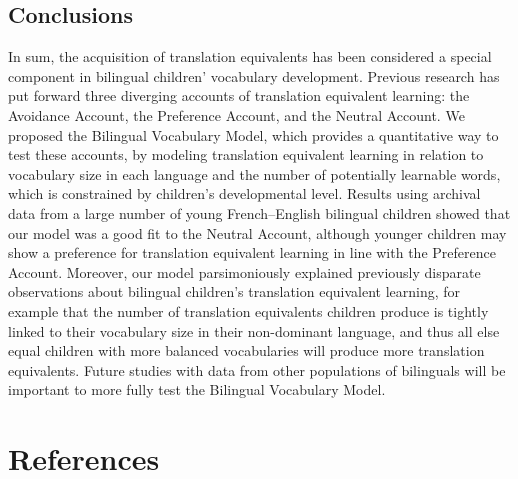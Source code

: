 \documentclass[
  english,
  ,man,floatsintext]{apa6}
\begin{document}
\hypertarget{conclusions}{%
\subsection{Conclusions}\label{conclusions}}

In sum, the acquisition of translation equivalents has been considered a special component in bilingual children' vocabulary development. Previous research has put forward three diverging accounts of translation equivalent learning: the Avoidance Account, the Preference Account, and the Neutral Account. We proposed the Bilingual Vocabulary Model, which provides a quantitative way to test these accounts, by modeling translation equivalent learning in relation to vocabulary size in each language and the number of potentially learnable words, which is constrained by children's developmental level. Results using archival data from a large number of young French--English bilingual children showed that our model was a good fit to the Neutral Account, although younger children may show a preference for translation equivalent learning in line with the Preference Account. Moreover, our model parsimoniously explained previously disparate observations about bilingual children's translation equivalent learning, for example that the number of translation equivalents children produce is tightly linked to their vocabulary size in their non-dominant language, and thus all else equal children with more balanced vocabularies will produce more translation equivalents. Future studies with data from other populations of bilinguals will be important to more fully test the Bilingual Vocabulary Model.

\newpage

\hypertarget{references}{%
\section{References}\label{references}}

\begingroup
\setlength{\parindent}{-0.5in}
\end{document}
